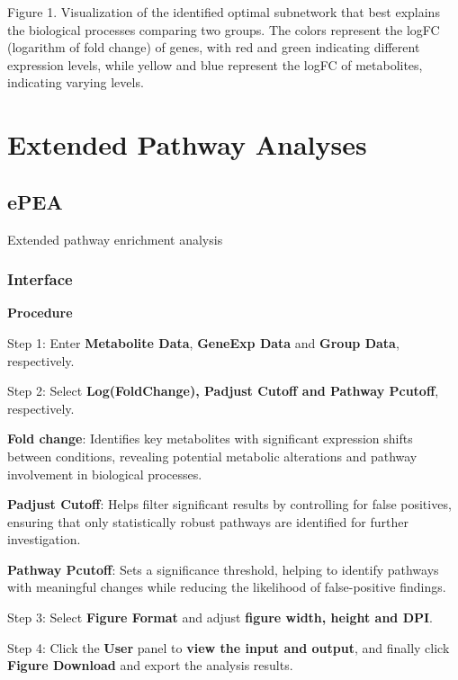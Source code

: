 \documentclass[
]{book}
\begin{document}
Figure 1. Visualization of the identified optimal subnetwork that best explains the biological processes comparing two groups. The colors represent the logFC (logarithm of fold change) of genes, with red and green indicating different expression levels, while yellow and blue represent the logFC of metabolites, indicating varying levels.

\chapter{Extended Pathway Analyses}\label{extended-pathway-analyses}

\section{ePEA}\label{epea}

Extended pathway enrichment analysis

\subsection{Interface}\label{interface-1}

\textbf{Procedure}

Step 1: Enter \textbf{Metabolite Data}, \textbf{GeneExp Data} and \textbf{Group Data}, respectively.

Step 2: Select \textbf{Log(FoldChange), Padjust Cutoff and Pathway Pcutoff}, respectively.

\textbf{Fold change}: Identifies key metabolites with significant expression shifts between conditions, revealing potential metabolic alterations and pathway involvement in biological processes.

\textbf{Padjust Cutoff}: Helps filter significant results by controlling for false positives, ensuring that only statistically robust pathways are identified for further investigation.

\textbf{Pathway Pcutoff}: Sets a significance threshold, helping to identify pathways with meaningful changes while reducing the likelihood of false-positive findings.

Step 3: Select \textbf{Figure Format} and adjust \textbf{figure width, height and DPI}.

Step 4: Click the \textbf{User} panel to \textbf{view the input and output}, and finally click \textbf{Figure Download} and export the analysis results.
\end{document}
